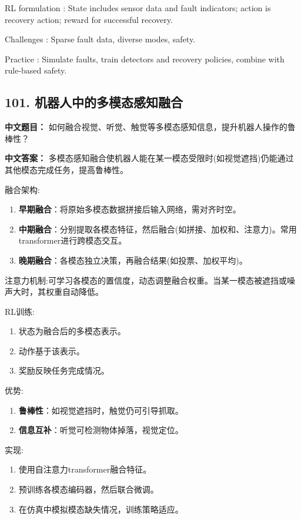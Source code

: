 \documentclass[10pt,a4paper]{ctexart}
\begin{document}
 RL formulation : State includes sensor data and fault indicators; action is recovery action; reward for successful recovery.

 Challenges : Sparse fault data, diverse modes, safety.

 Practice : Simulate faults, train detectors and recovery policies, combine with rule-based safety.

\subsection*{101. 机器人中的多模态感知融合}
\textbf{中文题目：} 如何融合视觉、听觉、触觉等多模态感知信息，提升机器人操作的鲁棒性？

\textbf{中文答案：}  
多模态感知融合使机器人能在某一模态受限时(如视觉遮挡)仍能通过其他模态完成任务，提高鲁棒性。

 融合架构:
\begin{enumerate}
    \item \textbf{早期融合}：将原始多模态数据拼接后输入网络，需对齐时空。
    \item \textbf{中期融合}：分别提取各模态特征，然后融合(如拼接、加权和、注意力)。常用transformer进行跨模态交互。
    \item \textbf{晚期融合}：各模态独立决策，再融合结果(如投票、加权平均)。
\end{enumerate}

 注意力机制:可学习各模态的置信度，动态调整融合权重。当某一模态被遮挡或噪声大时，其权重自动降低。

 RL训练:
\begin{enumerate}
    \item 状态为融合后的多模态表示。
    \item 动作基于该表示。
    \item 奖励反映任务完成情况。
\end{enumerate}

 优势:
\begin{enumerate}
    \item \textbf{鲁棒性}：如视觉遮挡时，触觉仍可引导抓取。
    \item \textbf{信息互补}：听觉可检测物体掉落，视觉定位。
\end{enumerate}

 实现:
\begin{enumerate}
    \item 使用自注意力transformer融合特征。
    \item 预训练各模态编码器，然后联合微调。
    \item 在仿真中模拟模态缺失情况，训练策略适应。
\end{enumerate}
\end{document}

